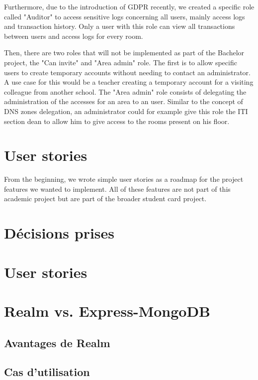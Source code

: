 \documentclass[11pt,a4paper]{report}
\begin{document}
Furthermore, due to the introduction of GDPR recently, we created a specific role called "Auditor" to access sensitive logs concerning all users, mainly access logs and transaction history. Only a user with this role can view all transactions between users and access logs for every room.

Then, there are two roles that will not be implemented as part of the Bachelor project, the "Can invite" and "Area admin" role. The first is to allow specific users to create temporary accounts without needing to contact an administrator. A use case for this would be a teacher creating a temporary account for a visiting colleague from another school. The "Area admin" role consists of delegating the administration of the accesses for an area to an user. Similar to the concept of DNS zones delegation, an administrator could for example give this role the ITI section dean to allow him to give access to the rooms present on his floor.

\section{User stories}
From the beginning, we wrote simple user stories as a roadmap for the project features we wanted to implement. All of these features are not part of this academic project but are part of the broader student card project. 

\section{Décisions prises}
\section{User stories}
\section{Realm vs. Express-MongoDB}
\subsection{Avantages de Realm}
\subsection{Cas d'utilisation}
\end{document}
